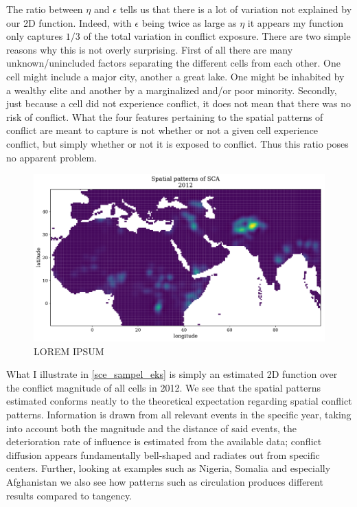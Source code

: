 \documentclass[a4paper]{article}
\begin{document}
The ratio between $\eta$ and $\epsilon$ tells us that there is a lot of variation not explained by our 2D function. Indeed, with $\epsilon$ being twice as large as $\eta$ it appears my function only captures $1/3$ of the total variation in conflict exposure. There are two simple reasons why this is not overly surprising. First of all there are many unknown/unincluded factors separating the different cells from each other. One cell might include a major city, another a great lake. One might be inhabited by a wealthy elite and another by a marginalized and/or poor minority. Secondly, just because a cell did not experience conflict, it does not mean that there was no risk of conflict. What the four features pertaining to the spatial patterns of conflict are meant to capture is not whether or not a given cell experience conflict, but simply whether or not it is exposed to conflict. Thus this ratio poses no apparent problem.\par

\begin{figure}[!htb]
	\centering
	\includegraphics[scale=0.47]{sce_2012_samples.pdf}
    \caption{\footnotesize{LOREM IPSUM}}\label{sce_sampel_eks}
\end{figure}

What I illustrate in \autoref{sce_sampel_eks} is simply an estimated 2D function over the conflict magnitude of all cells in 2012. We see that the spatial patterns estimated conforms neatly to the theoretical expectation regarding spatial conflict patterns. Information is drawn from all relevant events in the specific year, taking into account both the magnitude and the distance of said events, the deterioration rate of influence is estimated from the available data; conflict diffusion appears fundamentally bell-shaped and radiates out from specific centers. Further, looking at examples such as Nigeria, Somalia and especially Afghanistan we also see how patterns such as circulation produces different results compared to tangency.\par  
\end{document}
